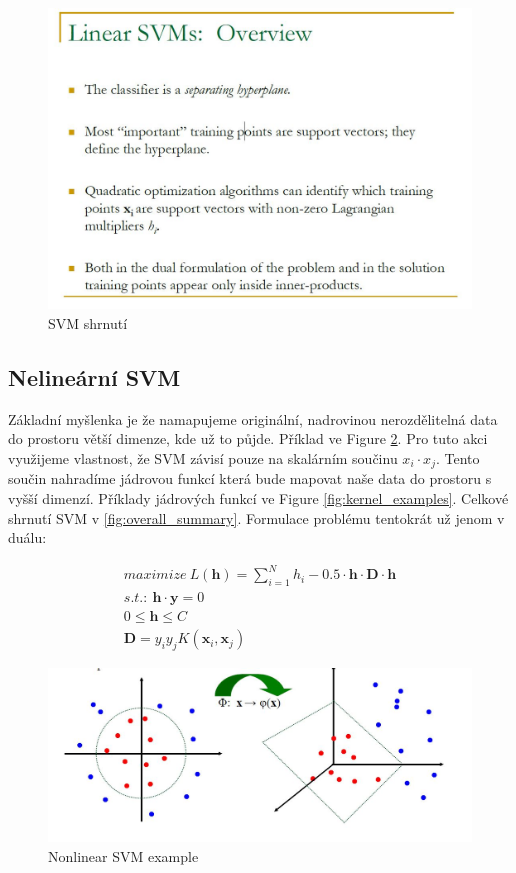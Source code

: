 \documentclass{article}
\begin{document}
\begin{figure}[h]
\begin{center}
\includegraphics[width=12cm]{SVM_overview.jpg}
\caption{SVM shrnutí}
\label{fig:SVM_overview}
\end{center}
\end{figure}

\subsection{Nelineární SVM}

Základní myšlenka je že namapujeme originální, nadrovinou nerozdělitelná data do prostoru větší dimenze, kde už to půjde. Příklad ve Figure \ref{fig:SVM_example}. Pro tuto akci využijeme vlastnost, že SVM závisí pouze na skalárním součinu $x_i \cdot x_j$. Tento součin nahradíme jádrovou funkcí která bude mapovat naše data do prostoru s vyšší dimenzí. Příklady jádrových funkcí ve Figure \ref{fig:kernel_examples}. Celkové shrnutí SVM v \ref{fig:overall_summary}.
Formulace problému tentokrát už jenom v duálu: 

\begin{gather}
maximize \  L(\textbf{h}) = \displaystyle\sum_{i = 1}^N h_i - 0.5 \cdot \textbf{h} \cdot \textbf{D} \cdot \textbf{h}\\
s.t.:\ \textbf{h} \cdot \textbf{y} = 0\\
 0 \leq \textbf{h} \leq C\\
 \textbf{D} = y_i y_j K(\textbf{x}_i, \textbf{x}_j)
\end{gather}

\begin{figure}[h]
\begin{center}
\includegraphics[width=12cm]{nonlinearSVM_example.jpg}
\caption{Nonlinear SVM example}
\label{fig:SVM_example}
\end{center}
\end{figure}
\end{document}
